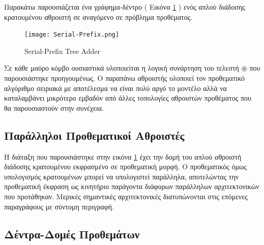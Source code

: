 Παρακάτω παρουσιάζεται ένα γράφημα-δέντρο ( Εικόνα \ref{Serial-PrefixTree} ) 
ενός απλού διάδοσης κρατουμένου αθροιστή σε αναγόμενο σε πρόβλημα προθέματος.\\ 
\begin{figure}[H]
\centering
\texttt{[image: Serial-Prefix.png]}
\caption{Serial-Prefix Tree Adder}
\label{Serial-PrefixTree}
\end{figure}
Σε κάθε μαύρο κόμβο ουσιαστικά υλοποιείται η λογική συνάρτηση του τελεστή $\circledast$
που παρουσιάστηκε προηγουμένως. Ο παραπάνω αθροιστής υλοποιεί τον προθεματικό αλγόριθμο
σειριακά με αποτέλεσμα να είναι πολύ αργό το μοντέλο αλλά να καταλαμβάνει μικρότερο εμβαδόν
από άλλες τοπολογίες αθροιστών προθέματος που θα παρουσιαστούν στην συνέχεια.\\












\subsection{Παράλληλοι Προθεματικοί Αθροιστές}
Η διάταξη που παρουσιάστηκε στην εικόνα \ref{Serial-PrefixTree} έχει την δομή 
του απλού αθροιστή διάδοσης κρατουμένου εκφρασμένο σε προθεματική μορφή. Ο προθεματικός
όμως υπολογισμός κρατουμένων μπορεί να υπολογιστεί παράλληλα, αποτελώντας την προθεματική 
έκφραση ως κινητήριο παράγοντα διάφορων παράλληλων αρχιτεκτονικών που προτάθηκαν.
Μερικές σημαντικές αρχιτεκτονικές διατυπώνονται στις επόμενες παραγράφους με σύντομη
περιγραφή.




\subsection{Δέντρα-Δομές Προθεμάτων}





